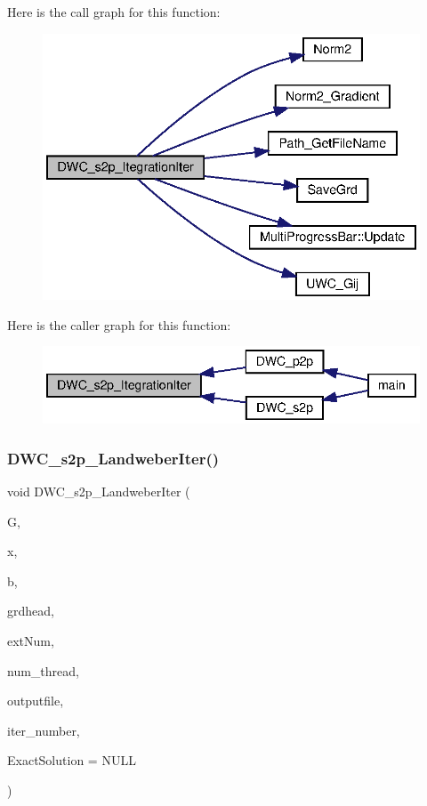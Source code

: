 Here is the call graph for this function\+:
\nopagebreak
\begin{figure}[H]
\begin{center}
\leavevmode
\includegraphics[width=334pt]{Conti2D_8h_a39a6a4cc378c878de458d5ae56eb1630_a39a6a4cc378c878de458d5ae56eb1630_cgraph}
\end{center}
\end{figure}
Here is the caller graph for this function\+:\nopagebreak
\begin{figure}[H]
\begin{center}
\leavevmode
\includegraphics[width=339pt]{Conti2D_8h_a39a6a4cc378c878de458d5ae56eb1630_a39a6a4cc378c878de458d5ae56eb1630_icgraph}
\end{center}
\end{figure}
\mbox{\label{Conti2D_8h_a30671331e25e6cfa739e77aec57b7f18_a30671331e25e6cfa739e77aec57b7f18}} 
\subsubsection{D\+W\+C\+\_\+s2p\+\_\+\+Landweber\+Iter()}
{\footnotesize\ttfamily void D\+W\+C\+\_\+s2p\+\_\+\+Landweber\+Iter (\begin{DoxyParamCaption}\item[{double $\ast$$\ast$}]{G,  }\item[{double $\ast$}]{x,  }\item[{double $\ast$}]{b,  }\item[{\textbf{ Grd\+Head}}]{grdhead,  }\item[{int}]{ext\+Num,  }\item[{int}]{num\+\_\+thread,  }\item[{string}]{outputfile,  }\item[{double}]{iter\+\_\+number,  }\item[{double $\ast$}]{Exact\+Solution = {\ttfamily NULL} }\end{DoxyParamCaption})}



